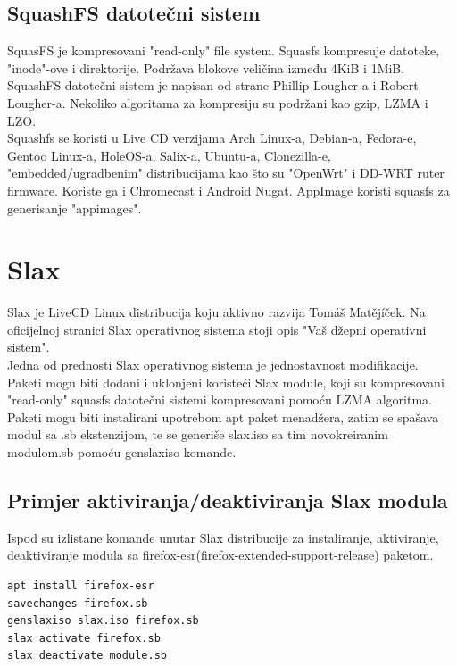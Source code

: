 \documentclass[12pt,vi]{mitthesis}
\begin{document}
\subsection*{SquashFS datotečni sistem}
\indent
SquasFS je kompresovani "read-only" file system. Squasfs kompresuje datoteke, "inode"-ove i direktorije. Podržava blokove veličina između 4KiB i 1MiB.\\
\indent
SquashFS datotečni sistem je napisan od strane 	Phillip Lougher-a i Robert Lougher-a. 
Nekoliko algoritama za kompresiju su podržani kao gzip, LZMA i LZO.\\
Squashfs se koristi u Live CD verzijama Arch Linux-a, Debian-a, Fedora-e, Gentoo Linux-a, HoleOS-a, Salix-a, Ubuntu-a, Clonezilla-e, "embedded/ugradbenim" distribucijama kao što su "OpenWrt" i DD-WRT ruter firmware. Koriste ga i Chromecast i Android Nugat. AppImage koristi squasfs za generisanje "appimages".\\

\section*{Slax}
\indent
Slax je LiveCD Linux distribucija koju aktivno razvija Tomáš Matějíček. Na oficijelnoj stranici Slax operativnog sistema stoji opis "Vaš džepni operativni sistem".\\
\indent
Jedna od prednosti Slax operativnog sistema je jednostavnost modifikacije. Paketi mogu biti dodani i uklonjeni koristeći Slax module, koji su kompresovani "read-only" squasfs datotečni sistemi kompresovani pomoću LZMA algoritma.\\
Paketi mogu biti instalirani upotrebom apt paket menadžera, zatim se spašava modul sa .sb ekstenzijom, te se generiše slax.iso sa tim novokreiranim modulom.sb pomoću genslaxiso komande.\\
\subsection*{Primjer aktiviranja/deaktiviranja Slax modula}
\indent
Ispod su izlistane komande unutar Slax distribucije za instaliranje, aktiviranje, deaktiviranje modula sa firefox-esr(firefox-extended-support-release) paketom.
\begin{lstlisting}[style=BashInputStyle]
apt install firefox-esr
savechanges firefox.sb
genslaxiso slax.iso firefox.sb
slax activate firefox.sb
slax deactivate module.sb
\end{lstlisting}
\end{document}
